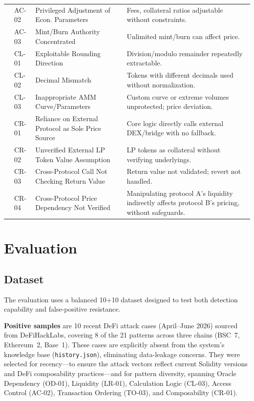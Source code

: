 \documentclass[10pt]{article}
\begin{document}
\begin{xltabular}{\textwidth}{
  >{\raggedright\arraybackslash}p{2.1cm}
  >{\raggedright\arraybackslash}p{1.1cm}
  >{\raggedright\arraybackslash}p{4.7cm}
  >{\raggedright\arraybackslash}X
}
& AC-02 & Privileged Adjustment of Econ. Parameters & Fees, collateral ratios adjustable without constraints. \\
& AC-03 & Mint/Burn Authority Concentrated & Unlimited mint/burn can affect price. \\
\midrule
{} & CL-01 & Exploitable Rounding Direction & Division/modulo remainder repeatedly extractable. \\
& CL-02 & Decimal Mismatch & Tokens with different decimals used without normalization. \\
& CL-03 & Inappropriate AMM Curve/Parameters & Custom curve or extreme volumes unprotected; price deviation. \\
\midrule
{} & CR-01 & Reliance on External Protocol as Sole Price Source & Core logic directly calls external DEX/bridge with no fallback. \\
& CR-02 & Unverified External LP Token Value Assumption & LP tokens as collateral without verifying underlyings. \\
& CR-03 & Cross-Protocol Call Not Checking Return Value & Return value not validated; revert not handled. \\
& CR-04 & Cross-Protocol Price Dependency Not Verified & Manipulating protocol A's liquidity indirectly affects protocol B's pricing, without safeguards. \\
\end{xltabular}

\section{Evaluation}

\subsection{Dataset}
The evaluation uses a balanced 10+10 dataset designed to test both detection capability and false-positive resistance.

\textbf{Positive samples} are 10 recent DeFi attack cases (April--June 2026) sourced from DeFiHackLabs, covering 8 of the 21 patterns across three chains (BSC~7, Ethereum~2, Base~1). These cases are explicitly absent from the system's knowledge base (\texttt{history.json}), eliminating data-leakage concerns. They were selected for recency---to ensure the attack vectors reflect current Solidity versions and DeFi composability practices---and for pattern diversity, spanning Oracle Dependency (OD-01), Liquidity (LR-01), Calculation Logic (CL-03), Access Control (AC-02), Transaction Ordering (TO-03), and Composability (CR-01).
\end{document}
